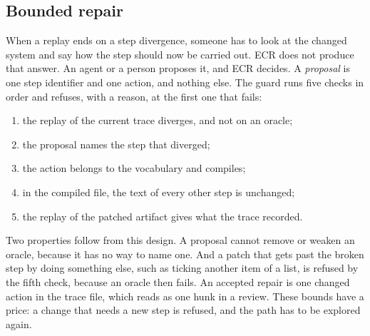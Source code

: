 \subsection{Bounded repair}
\label{sec:repair}

When a replay ends on a step divergence, someone has to look at the changed system and say how the step should now be carried out. ECR does not produce that answer. An agent or a person proposes it, and ECR decides. A \emph{proposal} is one step identifier and one action, and nothing else. The guard runs five checks in order and refuses, with a reason, at the first one that fails:
\begin{enumerate}
  \item the replay of the current trace diverges, and not on an oracle;
  \item the proposal names the step that diverged;
  \item the action belongs to the vocabulary and compiles;
  \item in the compiled file, the text of every other step is unchanged;
  \item the replay of the patched artifact gives what the trace recorded.
\end{enumerate}
Two properties follow from this design. A proposal cannot remove or weaken an oracle, because it has no way to name one. And a patch that gets past the broken step by doing something else, such as ticking another item of a list, is refused by the fifth check, because an oracle then fails. An accepted repair is one changed action in the trace file, which reads as one hunk in a review. These bounds have a price: a change that needs a new step is refused, and the path has to be explored again.
